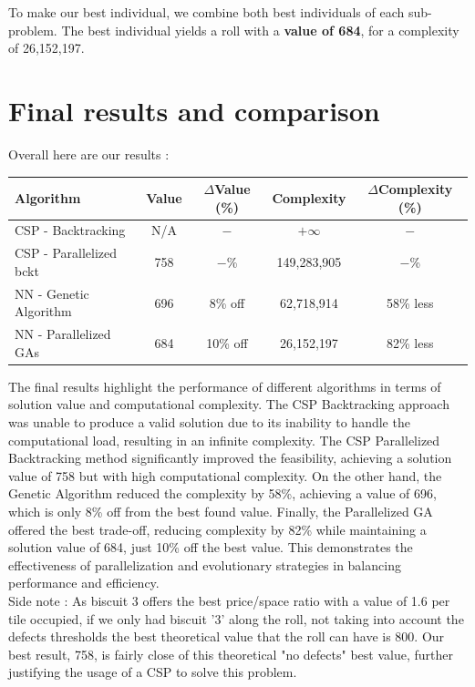 \documentclass{modeleRapport}
\begin{document}
To make our best individual, we combine both best individuals of each sub-problem. The best individual 
yields a roll with a \textbf{value of 684}, for a complexity of 26,152,197.



\newpage

\section{Final results and comparison}

Overall here are our results :

\begin{table}[h]
    \centering
    \begin{tabular}{l|c|c|c|c}
        Algorithm & Value & $\Delta$Value (\%) & Complexity & $\Delta$Complexity (\%)\\ \hline
        CSP - Backtracking & N/A & $-$ & $+\infty$ & $-$\\ \hline
        CSP - Parallelized bckt & 758 & $-$\% & 149,283,905 & $-$\%\\ \hline
        NN - Genetic Algorithm & 696 & 8\% off & 62,718,914 & 58\% less\\ \hline
        NN - Parallelized GAs & 684 & 10\% off & 26,152,197 & 82\% less\\ \hline
    \end{tabular}

\end{table}

The final results highlight the performance of different algorithms in terms of solution value and computational complexity. 
The CSP Backtracking approach was unable to produce a valid solution due to its inability to handle the computational load, 
resulting in an infinite complexity. The CSP Parallelized Backtracking method significantly improved the feasibility, 
achieving a solution value of 758 but with high computational complexity. On the other hand, the Genetic Algorithm reduced 
the complexity by 58\%, achieving a value of 696, which is only 8\% off from the best found value. Finally, the Parallelized 
GA offered the best trade-off, reducing complexity by 82\% while maintaining a solution value of 684, just 10\% off the 
best value. This demonstrates the effectiveness of parallelization and evolutionary strategies in balancing performance and 
efficiency.\\

Side note : As biscuit 3 offers the best price/space ratio with a value of 1.6 per tile occupied, if we only had biscuit '3'
along the roll, not taking into account the defects thresholds the best theoretical value that the roll can have is 800.
Our best result, 758, is fairly close of this theoretical "no defects" best value, further justifying the usage of a CSP to
solve this problem.
\end{document}
